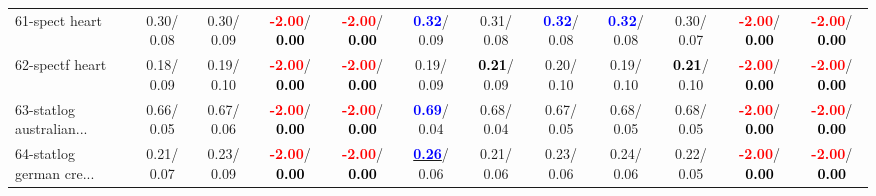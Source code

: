 \begin{table}[h]
\begin{center}
{\begin{tabular}{lc|c|c|c|c|c|c|c|c|c|c}
61-spect heart &   0.30/  0.08 &   0.30/  0.09 & \textcolor{red}{\textbf{ -2.00}}/\textcolor{black}{\textbf{  0.00}} & \textcolor{red}{\textbf{ -2.00}}/\textcolor{black}{\textbf{  0.00}} & \textcolor{blue}{\textbf{  0.32}}/  0.09 &   0.31/  0.08 & \textcolor{blue}{\textbf{  0.32}}/  0.08 & \textcolor{blue}{\textbf{  0.32}}/  0.08 &   0.30/  0.07 & \textcolor{red}{\textbf{ -2.00}}/\textcolor{black}{\textbf{  0.00}} & \textcolor{red}{\textbf{ -2.00}}/\textcolor{black}{\textbf{  0.00}} \\
62-spectf heart &   0.18/  0.09 &   0.19/  0.10 & \textcolor{red}{\textbf{ -2.00}}/\textcolor{black}{\textbf{  0.00}} & \textcolor{red}{\textbf{ -2.00}}/\textcolor{black}{\textbf{  0.00}} &   0.19/  0.09 & \textcolor{black}{\textbf{  0.21}}/  0.09 &   0.20/  0.10 &   0.19/  0.10 & \textcolor{black}{\textbf{  0.21}}/  0.10 & \textcolor{red}{\textbf{ -2.00}}/\textcolor{black}{\textbf{  0.00}} & \textcolor{red}{\textbf{ -2.00}}/\textcolor{black}{\textbf{  0.00}} \\
63-statlog australian... &   0.66/  0.05 &   0.67/  0.06 & \textcolor{red}{\textbf{ -2.00}}/\textcolor{black}{\textbf{  0.00}} & \textcolor{red}{\textbf{ -2.00}}/\textcolor{black}{\textbf{  0.00}} & \textcolor{blue}{\textbf{  0.69}}/  0.04 &   0.68/  0.04 &   0.67/  0.05 &   0.68/  0.05 &   0.68/  0.05 & \textcolor{red}{\textbf{ -2.00}}/\textcolor{black}{\textbf{  0.00}} & \textcolor{red}{\textbf{ -2.00}}/\textcolor{black}{\textbf{  0.00}} \\
64-statlog german cre... &   0.21/  0.07 &   0.23/  0.09 & \textcolor{red}{\textbf{ -2.00}}/\textcolor{black}{\textbf{  0.00}} & \textcolor{red}{\textbf{ -2.00}}/\textcolor{black}{\textbf{  0.00}} & \underline{\textcolor{blue}{\textbf{  0.26}}}/  0.06 &   0.21/  0.06 &   0.23/  0.06 &   0.24/  0.06 &   0.22/  0.05 & \textcolor{red}{\textbf{ -2.00}}/\textcolor{black}{\textbf{  0.00}} & \textcolor{red}{\textbf{ -2.00}}/\textcolor{black}{\textbf{  0.00}} \\\end{tabular}}\label{stratsALCKappa1aRF}
\end{center}
\end{table}

